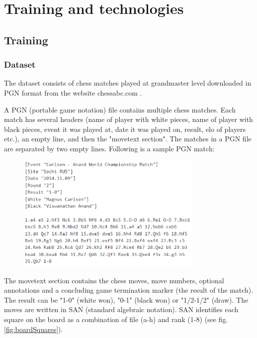 \chapter{Training and technologies}
\label{chap:ch5}

\section{Training}
\label{sec:ch5sec1}

\subsection{Dataset}
\label{subsec:ch5sec1subsec1}

The dataset consists of chess matches played at grandmaster level downloaded in PGN format from the website chessabc.com \cite{chessabc}.

A PGN (portable game notation) file contains multiple chess matches. Each match has several headers (name of player with white pieces, name of player with black pieces, event it was played at, date it was played on, result, elo of players etc.), an empty line, and then the "movetext section". The matches in a PGN file are separated by two empty lines. Following is a sample PGN match:
\begin{figure}[h]
    \includegraphics[width=0.8\textwidth]{figures/carlsen-anand-match.png}
\end{figure}

The movetext section contains the chess moves, move numbers, optional annotations and a concluding game termination marker (the result of the match). The result can be "1-0" (white won), "0-1" (black won) or "1/2-1/2" (draw). The moves are written in SAN (standard algebraic notation). SAN identifies each square on the board as a combination of file (a-h) and rank (1-8) (see fig. \ref{fig:boardSquares}).

